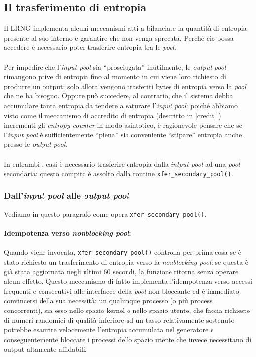 \documentclass{article}
\begin{document}
 \subsection{Il trasferimento di entropia}\label{trasferimentoentropia}
 Il LRNG implementa alcuni meccanismi atti a bilanciare la quantità di
 entropia presente al suo interno e garantire che non venga
 sprecata. Perché ciò possa accedere è necessario poter trasferire entropia tra
 le \emph{pool}. 
  
 \paragraph{}Per impedire che l'\emph{input pool} sia
 ``prosciugata'' inutilmente, le \emph{output pool} rimangono prive di entropia
 fino al momento in cui viene loro richiesto di produrre un output: solo allora
 vengono trasferiti bytes di entropia verso la
 \emph{pool} che ne ha bisogno.
 Oppure può succedere, al contrario, che il sistema debba accumulare tanta
 entropia da tendere a saturare l'\emph{input pool}: poiché abbiamo visto come
 il meccanismo di accredito di entropia (descritto in \ref{credit} ) incrementi
 gli \emph{entropy counter} in modo asintotico, è ragionevole pensare che se
 l'\emph{input pool} è sufficientemente ``piena'' sia conveniente ``stipare''
 entropia anche presso le \emph{output pool}.
 
 \paragraph{}In entrambi i casi è necessario trasferire entropia dalla
 \emph{intput pool} ad una \emph{pool} secondaria: questo compito è assolto
 dalla routine \verb+xfer_secondary_pool()+.
 
 
 \subsubsection{Dall'\emph{input pool} alle \emph{output
 pool}}\label{trasf_input_output}
 Vediamo in questo paragrafo come opera \verb+xfer_secondary_pool()+.
 
 \paragraph{Idempotenza verso \emph{nonblocking pool}:}Quando viene invocata,
 \verb+xfer_secondary_pool()+ controlla per prima cosa se è stato richiesto un
 trasferimento di entropia verso la \emph{nonblocking pool}: se questa è già
 stata aggiornata negli ultimi 60 secondi, la funzione ritorna senza operare
 alcun effetto. Questo meccanismo di fatto implementa l'idempotenza verso
 accessi frequenti e consecutivi alle interfacce della \emph{pool} non
 bloccante ed è immediato convincersi della sua necessità: un qualunque processo
 (o più processi concorrenti), sia esso nello spazio
 kernel o nello spazio utente, che faccia richieste di numeri randomici di
 qualità inferiore ad un tasso relativamente sostenuto potrebbe esaurire
 velocemente l'entropia accumulata nel generatore e conseguentemente bloccare i
 processi dello spazio utente che invece necessitano di output altamente
 affidabili. 
 
\end{document}
